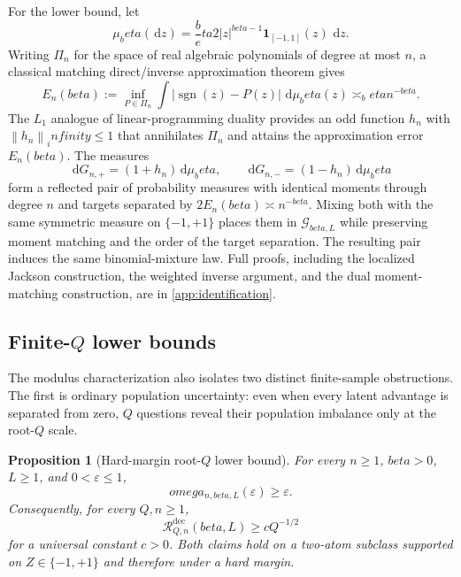 \documentclass[11pt]{article}
\def\beta{beta}%
\def\omega{omega}%
\def\infty{infinity}%
\newtheorem{proposition}[theorem]{Proposition}
\newcommand{\one}{\mathbf 1}
\newcommand{\sgn}{\operatorname{sgn}}
\newcommand{\calG}{\mathcal G}
\newcommand{\calR}{\mathcal R}
\newcommand{\eps}{\varepsilon}
\newcommand{\norm}[1]{\left\lVert#1\right\rVert}
\newcommand{\dd}{\,\mathrm d}
\newcommand\aed[1]{{\color{magenta!60!black} #1}}
\newcommand\eed[1]{{\color{green!45!black} #1}}
\begin{document}
For the lower bound, let
\[
\mu_\beta(\dd z)
=
\frac\beta2|z|^{\beta-1}\one_{[-1,1]}(z)\,\dd z.
\]
\eed{Writing $\Pi_n$ for the space of real algebraic polynomials of degree at most $n$, a classical matching direct/inverse approximation theorem gives}
\begin{equation}
\label{eq:weighted-L1}
E_n(\beta)
:=
\inf_{P\in\Pi_n}
\int|\sgn(z)-P(z)|\,\dd\mu_\beta(z)
\asymp_\beta n^{-\beta}.
\end{equation}
\eed{The $L_1$ analogue of linear-programming duality provides an odd function $h_n$ with $\norm{h_n}_\infty\le1$ that annihilates $\Pi_n$ and attains the approximation error \aed{$E_n(\beta)$}.  The measures
\[
\dd G_{n,+}=(1+h_n)\dd\mu_\beta,
\qquad
\dd G_{n,-}=(1-h_n)\dd\mu_\beta
\]
form a reflected pair of probability measures with identical moments through degree $n$ and targets separated by $2E_n(\beta)\asymp n^{-\beta}$.  Mixing both with the same symmetric measure on $\{-1,+1\}$ places them in $\calG_{\beta,L}$ while preserving moment matching and the order of the target separation.  The resulting pair induces the same binomial-mixture law.  Full proofs, including the localized Jackson construction, the weighted inverse argument, and the dual moment-matching construction, are in \cref{app:identification}.}



\subsection{Finite-\texorpdfstring{$Q$}{Q} lower bounds}

\eed{The modulus characterization also isolates two distinct finite-sample obstructions.  The first is ordinary population uncertainty: even when every latent advantage is separated from zero, $Q$ questions reveal their population imbalance only at the root-$Q$ scale.}

\begin{proposition}[Hard-margin root-$Q$ lower bound]
\label{thm:rootQ-scalar}
For every $n\ge1$, $\beta>0$, $L\ge1$, and $0<\eps\le1$,
\begin{equation}
\label{eq:rootQ-modulus}
\omega_{n,\beta,L}(\eps)\ge\eps.
\end{equation}
Consequently, for every $Q,n\ge1$,
\begin{equation}
\label{eq:rootQ-scalar}
\calR^{\mathrm{dec}}_{Q,n}(\beta,L)
\ge cQ^{-1/2}
\end{equation}
for a universal constant $c>0$.  Both claims hold on a two-atom subclass supported on $Z\in\{-1,+1\}$ and therefore under a hard margin.
\end{proposition}
\end{document}
